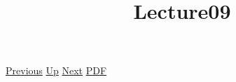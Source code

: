 \documentclass[12pt,a4paper]{report}
\begin{document}
 \href{doc/phil/People/Brandom/Antirepresentationalism/Lecture08.html}{Previous} 
 \href{doc/phil/People/Brandom/Antirepresentationalism.html}{Up} 
 \href{doc/phil/People/Brandom/Antirepresentationalism/Lecture10.html}{Next} 
 \href{doc/phil/People/Brandom/Antirepresentationalism/Lecture09.pdf}{PDF} 
\title{Lecture09}

\tableofcontents
\end{document}
